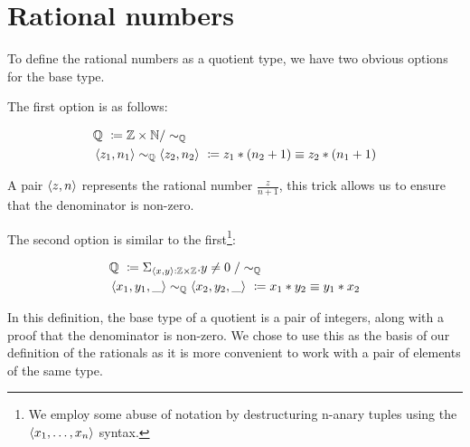 \documentclass[12pt,twoside,maitrise]{dms}
\theoremstyle{definition}
\numberwithin{equation}{section}
\numberwithin{table}{chapter}
\numberwithin{figure}{chapter}
\begin{document}
\section{Rational numbers}
To define the rational numbers as a quotient type, we have two obvious options for the base type.

The first option is as follows:

\begin{align*}
  & \mathbb{Q} \ \coloneqq \mathbb{Z} \times \mathbb{N} / \sim_{\mathbb{Q}} \\
  & \braket{z_1 , n_1} \sim_{\mathbb{Q}} \braket{z_2 , n_2} \ \coloneqq z_1 * (n_2 + 1) \equiv z_2 * (n_1 + 1)
\end{align*}

A pair $\braket{z , n}$ represents the rational number $\frac{z}{n + 1}$, this
trick allows us to ensure that the denominator is non-zero.

The second option is similar to the first\footnote{We employ some abuse of
notation by destructuring n-anary tuples using the $\braket{x_1, \ldots,
  x_n}$ syntax.}:

\begin{align*}
  & \mathbb{Q} \ \coloneqq \Sigma_{\oftype{\braket{x, y}}{\mathbb{Z} \times \mathbb{Z}}} . y \ne 0\; / \sim_{\mathbb{Q}} \\
  & \braket{x_1 , y_1, \_} \sim_{\mathbb{Q}} \braket{x_2 , y_2, \_} \ \coloneqq x_1 * y_2 \equiv y_1 * x_2
\end{align*}

In this definition, the base type of a quotient is a pair of integers, along
with a proof that the denominator is non-zero. We chose to use this as the basis
of our definition of the rationals as it is more convenient to work with a pair
of elements of the same type.
\end{document}
